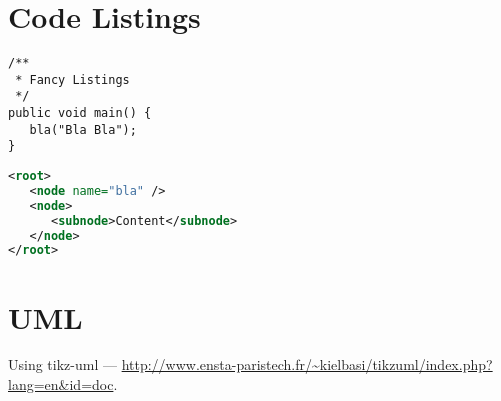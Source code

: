 \section*{Code Listings}

\begin{lstlisting}[caption=Fancy Java Code Listing]
/**
 * Fancy Listings
 */
public void main() {
   bla("Bla Bla");
}
\end{lstlisting}

\begin{lstlisting}[language=XML, caption=Fancy XML]
<root>
   <node name="bla" />
   <node>
      <subnode>Content</subnode>
   </node>
</root>
\end{lstlisting}

\section*{UML}
Using tikz-uml --- \url{http://www.ensta-paristech.fr/~kielbasi/tikzuml/index.php?lang=en&id=doc}.

